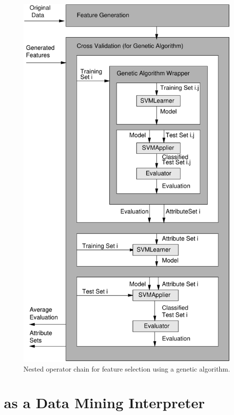 \begin{figure}[tbp]
  \center
  \includegraphics{graphics/genplusXValForGA.pdf}
  \caption[Feature selection using a genetic algorithm]{Nested operator chain for feature selection using a genetic algorithm.}
  \label{fig:methodvalidationchain_box}
\end{figure}





\section{\rapidminer as a Data Mining Interpreter}

